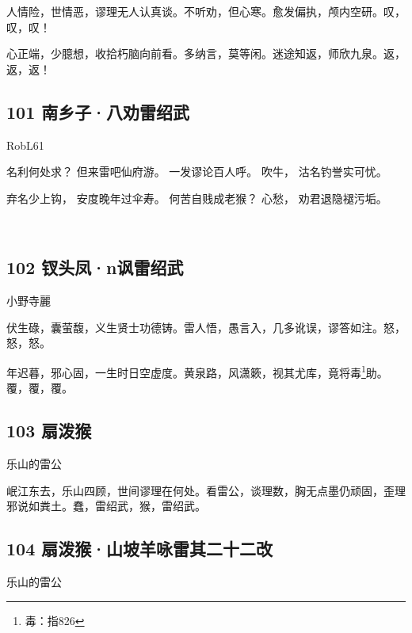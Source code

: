 人情险，世情恶，谬理无人认真谈。不听劝，但心寒。愈发偏执，颅内空研。叹，叹，叹！

心正端，少臆想，收拾朽脑向前看。多纳言，莫等闲。迷途知返，师欣九泉。返，返，返！

\hypertarget{ux5357ux4e61ux5b50ux516bux529dux96f7ux7ecdux6b66}{%
\subsection{\texorpdfstring{101 南乡子·八劝雷绍武
}{101 南乡子·八劝雷绍武 }}\label{ux5357ux4e61ux5b50ux516bux529dux96f7ux7ecdux6b66}}

{RobL61}

名利何处求？ 但来雷吧仙府游。 一发谬论百人呼。 吹牛， 沽名钓誉实可忧。

弃名少上钩， 安度晚年过伞寿。 何苦自贱成老猴？ 心愁， 劝君退隐褪污垢。

~\\

\hypertarget{ux9497ux5934ux51e4nux8bbdux96f7ux7ecdux6b66}{%
\subsection{102
钗头凤·n讽雷绍武}\label{ux9497ux5934ux51e4nux8bbdux96f7ux7ecdux6b66}}

{小野寺麗}

伏生碌，囊萤馥，义生贤士功德铸。雷人悟，愚言入，几多讹误，谬答如注。怒，怒，怒。

年迟暮，邪心固，一生时日空虚度。黄泉路，风潇簌，视其尤库，竟将毒\footnote{毒：指826}助。覆，覆，覆。

\hypertarget{ux6247ux6cfcux7334}{%
\subsection{103 扇泼猴}\label{ux6247ux6cfcux7334}}

{乐山的雷公}

岷江东去，乐山四顾，世间谬理在何处。看雷公，谈理数，胸无点墨仍顽固，歪理邪说如粪土。蠢，雷绍武，猴，雷绍武。

\hypertarget{ux6247ux6cfcux7334ux5c71ux5761ux7f8aux548fux96f7ux5176ux4e8cux5341ux4e8cux6539}{%
\subsection{104
扇泼猴·山坡羊咏雷其二十二改}\label{ux6247ux6cfcux7334ux5c71ux5761ux7f8aux548fux96f7ux5176ux4e8cux5341ux4e8cux6539}}

{乐山的雷公}

